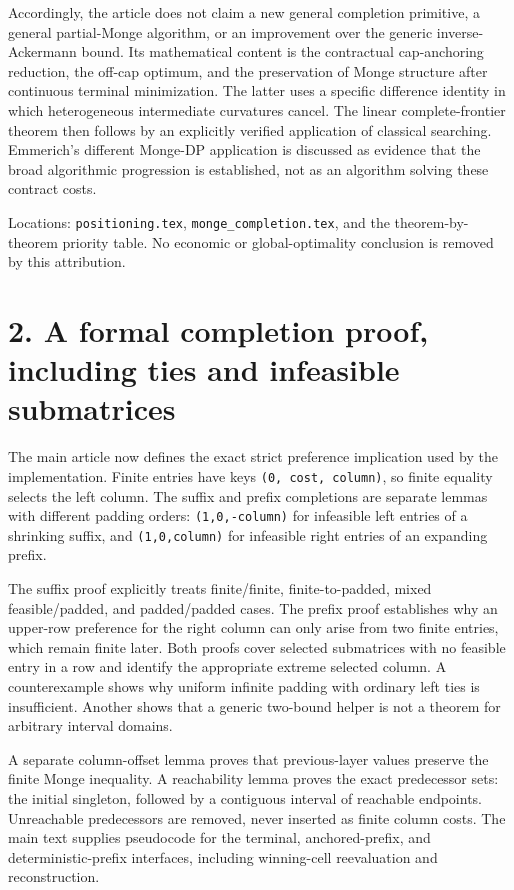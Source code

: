 \documentclass[11pt,letterpaper]{article}
\theoremstyle{definition}\newtheorem{assumption}[theorem]{Assumption}
\begin{document}
Accordingly, the article does not claim a new general completion primitive, a general partial-Monge algorithm, or an improvement over the generic inverse-Ackermann bound. Its mathematical content is the contractual cap-anchoring reduction, the off-cap optimum, and the preservation of Monge structure after continuous terminal minimization. The latter uses a specific difference identity in which heterogeneous intermediate curvatures cancel. The linear complete-frontier theorem then follows by an explicitly verified application of classical searching. Emmerich's different Monge-DP application is discussed as evidence that the broad algorithmic progression is established, not as an algorithm solving these contract costs.

Locations: \texttt{positioning.\allowbreak{}tex}, \texttt{monge\_\allowbreak{}completion.\allowbreak{}tex}, and the theorem-by-theorem priority table. No economic or global-optimality conclusion is removed by this attribution.

\section*{2. A formal completion proof, including ties and infeasible submatrices}

The main article now defines the exact strict preference implication used by the implementation. Finite entries have keys \texttt{(0, cost, column)}, so finite equality selects the left column. The suffix and prefix completions are separate lemmas with different padding orders: \texttt{(1,0,-\allowbreak{}column)} for infeasible left entries of a shrinking suffix, and \texttt{(1,0,column)} for infeasible right entries of an expanding prefix.

The suffix proof explicitly treats finite/finite, finite-to-padded, mixed feasible/padded, and padded/padded cases. The prefix proof establishes why an upper-row preference for the right column can only arise from two finite entries, which remain finite later. Both proofs cover selected submatrices with no feasible entry in a row and identify the appropriate extreme selected column. A counterexample shows why uniform infinite padding with ordinary left ties is insufficient. Another shows that a generic two-bound helper is not a theorem for arbitrary interval domains.

A separate column-offset lemma proves that previous-layer values preserve the finite Monge inequality. A reachability lemma proves the exact predecessor sets: the initial singleton, followed by a contiguous interval of reachable endpoints. Unreachable predecessors are removed, never inserted as finite column costs. The main text supplies pseudocode for the terminal, anchored-prefix, and deterministic-prefix interfaces, including winning-cell reevaluation and reconstruction.
\end{document}
